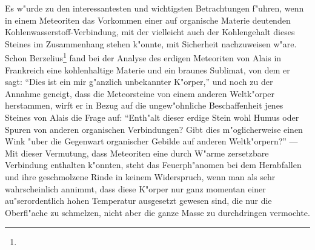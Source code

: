 \documentclass[a4paper, 11pt, oneside]{article}
\begin{document}
Es w"urde zu den interessantesten und wichtigsten Betrachtungen f"uhren, wenn in einem Meteoriten das Vorkommen einer auf organische Materie deutenden Kohlenwasserstoff-Verbindung, mit der vielleicht auch der Kohlengehalt dieses Steines im Zusammenhang stehen k"onnte, mit Sicherheit nachzuweisen w"are. Schon Berzelius\footnote{} fand bei der Analyse des erdigen Meteoriten von Alais in Frankreich eine kohlenhaltige Materie und ein braunes Sublimat, von dem er sagt: "`Dies ist ein mir g"anzlich unbekannter K"orper,"' und noch zu der Annahme geneigt, dass die Meteorsteine von einem anderen Weltk"orper herstammen, wirft er in Bezug auf die ungew"ohnliche Beschaffenheit jenes Steines von Alais die Frage auf: "`Enth"alt dieser erdige Stein wohl Humus oder Spuren von anderen organischen Verbindungen? Gibt dies m"oglicherweise einen Wink "uber die Gegenwart organischer Gebilde auf anderen Weltk"orpern?"' --- Mit dieser Vermutung, dass Meteoriten eine durch W"arme zersetzbare Verbindung enthalten k"onnten, steht das Feuerph"anomen bei dem Herabfallen und ihre geschmolzene Rinde in keinem Widerspruch, wenn man als sehr wahrscheinlich annimmt, dass diese K"orper nur ganz momentan einer au"serordentlich hohen Temperatur ausgesetzt gewesen sind, die nur die Oberfl"ache zu schmelzen, nicht aber die ganze Masse zu durchdringen vermochte.
\clearpage
\end{document}
